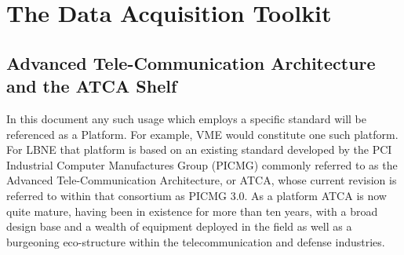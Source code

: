 \section{The Data Acquisition Toolkit}




\subsection{Advanced Tele-Communication Architecture and the ATCA Shelf}
\label{sec:ATCA}

In this document any such usage which employs a specific standard will be referenced as a Platform. For example, VME would constitute one such platform. For LBNE that platform is based on an existing standard developed by the PCI Industrial Computer Manufactures Group (PICMG) commonly referred to as the Advanced Tele-Communication Architecture, or ATCA, whose current revision is referred to within that consortium as PICMG 3.0. As a platform ATCA is now quite mature, having been in existence for more than ten years, with a broad design base and a wealth of equipment deployed in the field as well as a burgeoning eco-structure within the telecommunication and defense industries.

